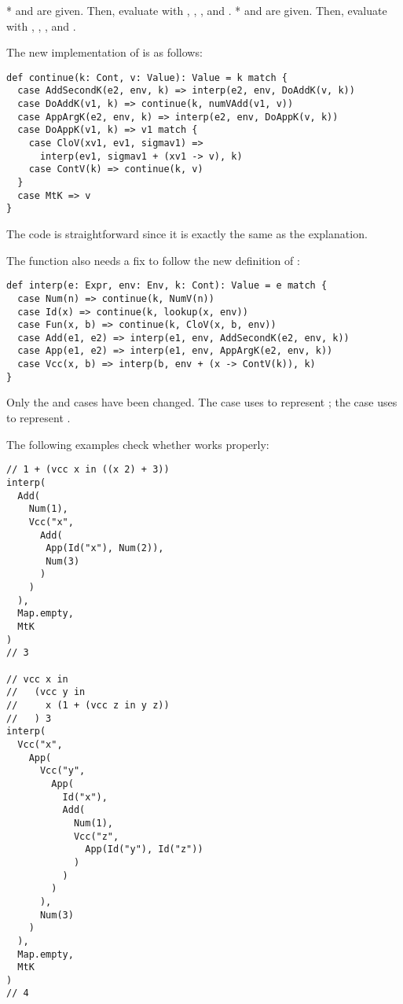 *  and  are given. Then, evaluate  with , , , and .
*  and  are given. Then, evaluate  with , , , and .

The new implementation of  is as follows:

\begin{verbatim}
def continue(k: Cont, v: Value): Value = k match {
  case AddSecondK(e2, env, k) => interp(e2, env, DoAddK(v, k))
  case DoAddK(v1, k) => continue(k, numVAdd(v1, v))
  case AppArgK(e2, env, k) => interp(e2, env, DoAppK(v, k))
  case DoAppK(v1, k) => v1 match {
    case CloV(xv1, ev1, sigmav1) =>
      interp(ev1, sigmav1 + (xv1 -> v), k)
    case ContV(k) => continue(k, v)
  }
  case MtK => v
}
\end{verbatim}

The code is straightforward since it is exactly the same as the explanation.

The  function also needs a fix to follow the new definition of
:

\begin{verbatim}
def interp(e: Expr, env: Env, k: Cont): Value = e match {
  case Num(n) => continue(k, NumV(n))
  case Id(x) => continue(k, lookup(x, env))
  case Fun(x, b) => continue(k, CloV(x, b, env))
  case Add(e1, e2) => interp(e1, env, AddSecondK(e2, env, k))
  case App(e1, e2) => interp(e1, env, AppArgK(e2, env, k))
  case Vcc(x, b) => interp(b, env + (x -> ContV(k)), k)
}
\end{verbatim}

Only the  and  cases have been changed. The  case
uses  to represent ; the  case uses  to represent .

The following examples check whether  works properly:

\begin{verbatim}
// 1 + (vcc x in ((x 2) + 3))
interp(
  Add(
    Num(1),
    Vcc("x",
      Add(
       App(Id("x"), Num(2)),
       Num(3)
      )
    )
  ),
  Map.empty,
  MtK
)
// 3

// vcc x in
//   (vcc y in
//     x (1 + (vcc z in y z))
//   ) 3
interp(
  Vcc("x",
    App(
      Vcc("y",
        App(
          Id("x"),
          Add(
            Num(1),
            Vcc("z",
              App(Id("y"), Id("z"))
            )
          )
        )
      ),
      Num(3)
    )
  ),
  Map.empty,
  MtK
)
// 4
\end{verbatim}

